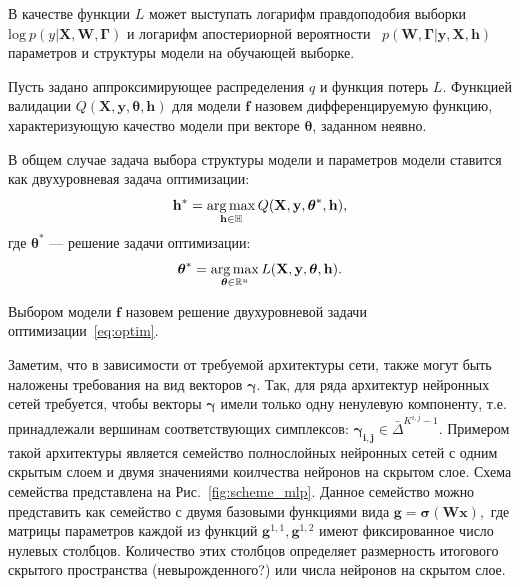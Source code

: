 В качестве функции $L$ может выступать логарифм правдоподобия выборки $\text{log}~p(y|\mathbf{X}, \mathbf{W}, \boldsymbol{\Gamma})$  и логарифм апостериорной вероятности ~$p(\mathbf{W}, \boldsymbol{\Gamma}|\mathbf{y}, \mathbf{X}, \mathbf{h}) $ параметров и структуры модели на обучающей выборке.

\begin{defin}
Пусть задано аппроксимирующее распределения $q$ и функция потерь $L$. 
Функцией валидации $Q(\mathbf{X}, \mathbf{y}, \boldsymbol{\theta}, \mathbf{h})$ для модели $\mathbf{f}$ назовем дифференцируемую функцию, характеризующую качество модели при векторе $\boldsymbol{\theta}$, заданном неявно.
\end{defin}


В общем случае задача выбора структуры модели и параметров модели ставится как двухуровневая задача оптимизации:
\begin{equation}
\label{eq:optim}
	\mathbf{h}^{*} = \operatorname*{arg\,max}_{\mathbf{h} \in \mathbb{H}} Q(\mathbf{X}, \mathbf{y}, \boldsymbol{\theta}^{*}, \mathbf{h}),
\end{equation}
где $\boldsymbol{\theta}^{*}$ --- решение задачи оптимизации:
\[
   \boldsymbol{\theta}^{*} = \operatorname*{arg\,max}_{\boldsymbol{\theta} \in \mathbb{R}^u} L(\mathbf{X}, \mathbf{y}, \boldsymbol{\theta}, \mathbf{h}).
\]


\begin{defin}
Выбором модели $\mathbf{f}$ назовем решение двухуровневой задачи оптимизации~\eqref{eq:optim}.
\end{defin}

Заметим, что в зависимости от требуемой архитектуры сети, также могут быть наложены требования на вид векторов $\boldsymbol{\gamma}$. 
Так, для ряда архитектур нейронных сетей требуется, чтобы векторы $\boldsymbol{\gamma}$ имели только одну ненулевую компоненту, т.е. принадлежали вершинам соответствующих симплексов: $ \boldsymbol{\gamma_{i,j}} \in \bar{\Delta}^{K^{i,j}-1}$. Примером такой архитектуры является семейство полнослойных нейронных сетей с одним скрытым слоем и двумя значениями коилчества нейронов на скрытом слое. Схема семейства представлена на Рис.~\ref{fig:scheme_mlp}. Данное семейство можно представить как семейство с двумя базовыми функциями вида $\mathbf{g} = \boldsymbol{\sigma}(\mathbf{W}\mathbf{x}),$ где матрицы параметров каждой из функций  $\mathbf{g}^{1,1}, \mathbf{g}^{1,2}$ имеют фиксированное число нулевых столбцов. Количество этих столбцов определяет размерность итогового скрытого пространства (невырожденного?) или числа нейронов на скрытом слое.



